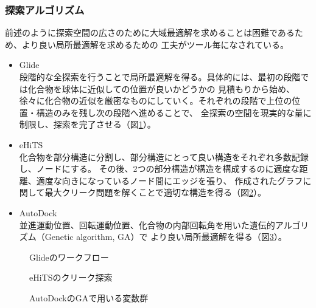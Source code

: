 \subsubsection{探索アルゴリズム}
前述のように探索空間の広さのために大域最適解を求めることは困難であるため、より良い局所最適解を求めるための
工夫がツール毎になされている。
\begin{itemize}
\item Glide\\
	段階的な全探索を行うことで局所最適解を得る。具体的には、最初の段階では化合物を球体に近似しての位置が良いかどうかの
	見積もりから始め、徐々に化合物の近似を厳密なものにしていく。それぞれの段階で上位の位置・構造のみを残し次の段階へ進めることで、
	全探索の空間を現実的な量に制限し、探索を完了させる（図\ref{fig:glide_flowchart}）。
\item eHiTS\\
	化合物を部分構造に分割し、部分構造にとって良い構造をそれぞれ多数記録し、ノードにする。
	その後、2つの部分構造が構造を構成するのに適度な距離、適度な向きになっているノード間にエッジを張り、
	作成されたグラフに関して最大クリーク問題を解くことで適切な構造を得る（図\ref{fig:eHiTS_clique}）。
\item AutoDock\\
	並進運動位置、回転運動位置、化合物の内部回転角を用いた遺伝的アルゴリズム（Genetic algorithm, GA）で
	より良い局所最適解を得る（図\ref{fig:AutoDock_gene}）。
\end{itemize}

\begin{figure}[htb]
 \begin{center}
  \caption{Glideのワークフロー}
  \label{fig:glide_flowchart}
 \end{center}
\end{figure}
\begin{figure}[htb]
 \begin{center}
  \caption{eHiTSのクリーク探索}
  \label{fig:eHiTS_clique}
 \end{center}
\end{figure}
\begin{figure}[htb]
 \begin{center}
  \caption{AutoDockのGAで用いる変数群}
  \label{fig:AutoDock_gene}
 \end{center}
\end{figure}


